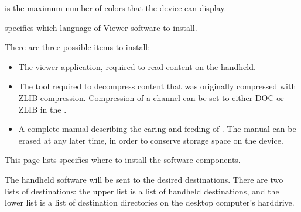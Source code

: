  is the maximum number of 
colors that the device can display. 


 specifies which language of 
Viewer software to install.

There are three possible items to install:

\begin{itemize}
  \item {} The viewer application, 
  required to read \brandingapplicationsuitename content on the handheld.

  \item {} The tool required to
  decompress \brandingapplicationsuitename content that was originally compressed with ZLIB
  compression. Compression of a channel can be set to either DOC or ZLIB in 
  the 
  \helpignore{\ref{sec:pd-channel-dialog-output-tab}}
  .

  \item {} A complete manual 
  describing the caring and feeding of \brandingapplicationsuitename. The manual can be erased at 
  any later time, in order to conserve storage space on the device.
\end{itemize}


This page lists specifies where to install the software components.

The handheld software will be sent to the desired destinations. There are two 
lists of destinations: the upper list is a list of handheld destinations, and
the lower list is a list of destination directories on the desktop computer's
harddrive.

